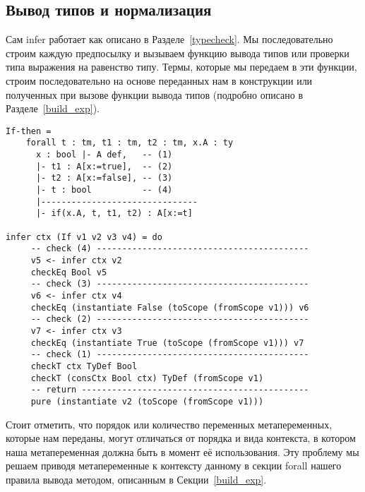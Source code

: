 \subsection{Вывод типов и нормализация}\label{nf_infer}
Сам infer работает как описано в Разделе~\ref{typecheck}. Мы последовательно строим каждую предпосылку и вызываем функцию вывода типов или проверки типа выражения на равенство типу. Термы, которые мы передаем в эти функции, строим последовательно на основе переданных нам в конструкции или полученных при вызове функции вывода типов (подробно описано в Разделе~\ref{build_exp}).

\begin{lstlisting}[caption={Пример правила вывода и части сгенерированной функции infer, соответствующей этому правилу},captionpos=b, frame=single, float, floatplacement=H]
If-then =
    forall t : tm, t1 : tm, t2 : tm, x.A : ty
      x : bool |- A def,   -- (1)
      |- t1 : A[x:=true],  -- (2)
      |- t2 : A[x:=false], -- (3)
      |- t : bool          -- (4)
      |-------------------------------
      |- if(x.A, t, t1, t2) : A[x:=t]

infer ctx (If v1 v2 v3 v4) = do
     -- check (4) ------------------------------------------
     v5 <- infer ctx v2
     checkEq Bool v5
     -- check (3) ------------------------------------------
     v6 <- infer ctx v4
     checkEq (instantiate False (toScope (fromScope v1))) v6
     -- check (2) ------------------------------------------
     v7 <- infer ctx v3
     checkEq (instantiate True (toScope (fromScope v1))) v7
     -- check (1) ------------------------------------------
     checkT ctx TyDef Bool
     checkT (consCtx Bool ctx) TyDef (fromScope v1)
     -- return ---------------------------------------------
     pure (instantiate v2 (toScope (fromScope v1)))
\end{lstlisting}

Стоит отметить, что порядок или количество переменных метапеременных, которые нам переданы, могут отличаться от порядка и вида контекста, в котором наша метапеременная должна быть в момент её использования. Эту проблему мы решаем приводя метапеременные к контексту данному в секции forall нашего правила вывода методом, описанным в Секции~\ref{build_exp}.

